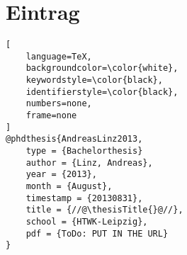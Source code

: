 \chapter*{\BibTeX{} Eintrag}


\begin{lstlisting}[
	language=TeX,
	backgroundcolor=\color{white},
	keywordstyle=\color{black},
	identifierstyle=\color{black},
	numbers=none,
	frame=none
]
@phdthesis{AndreasLinz2013,
	type = {Bachelorthesis}
	author = {Linz, Andreas},
	year = {2013},
	month = {August},
	timestamp = {20130831},
	title = {//@\thesisTitle{}@//},
	school = {HTWK-Leipzig},
	pdf = {ToDo: PUT IN THE URL}
}
\end{lstlisting}